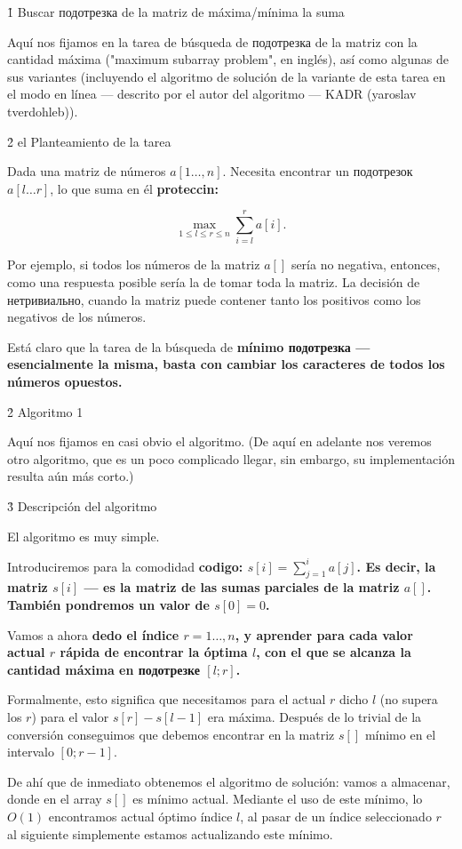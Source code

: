 \h1{ Buscar подотрезка de la matriz de máxima/mínima la suma }

Aquí nos fijamos en la tarea de búsqueda de подотрезка de la matriz con la cantidad máxima ("maximum subarray problem", en inglés), así como algunas de sus variantes (incluyendo el algoritmo de solución de la variante de esta tarea en el modo en línea --- descrito por el autor del algoritmo --- KADR (yaroslav tverdohleb)).


\h2{ el Planteamiento de la tarea }

Dada una matriz de números $a[1 \ldots, n]$. Necesita encontrar un подотрезок $a[l \ldots r]$, lo que suma en él \bf{proteccin}:

$$ \max_{ 1 \le l \le r \le n } \sum_{i=l}^{r} a[i]. $$

Por ejemplo, si todos los números de la matriz $a[]$ sería no negativa, entonces, como una respuesta posible sería la de tomar toda la matriz. La decisión de нетривиально, cuando la matriz puede contener tanto los positivos como los negativos de los números.

Está claro que la tarea de la búsqueda de \bf{mínimo} подотрезка --- esencialmente la misma, basta con cambiar los caracteres de todos los números opuestos.


\h2{ Algoritmo 1 }

Aquí nos fijamos en casi obvio el algoritmo. (De aquí en adelante nos veremos otro algoritmo, que es un poco complicado llegar, sin embargo, su implementación resulta aún más corto.)

\h3{ Descripción del algoritmo }

El algoritmo es muy simple.

Introduciremos para la comodidad \bf{codigo}: $s[i] = \sum_{j=1}^{i} a[j]$. Es decir, la matriz $s[i]$ --- es la matriz de las sumas parciales de la matriz $a[]$. También pondremos un valor de $s[0] = 0$.

Vamos a ahora \bf{dedo} el índice $r = 1 \ldots, n$, y aprender para cada valor actual $r$ rápida de encontrar la óptima $l$, con el que se alcanza la cantidad máxima en подотрезке $[l; r]$.

Formalmente, esto significa que necesitamos para el actual $r$ dicho $l$ (no supera los $r$) para el valor $s[r] - s[l-1]$ era máxima. Después de lo trivial de la conversión conseguimos que debemos encontrar en la matriz $s[]$ mínimo en el intervalo $[0;r-1]$.

De ahí que de inmediato obtenemos el algoritmo de solución: vamos a almacenar, donde en el array $s[]$ es mínimo actual. Mediante el uso de este mínimo, lo $O(1)$ encontramos actual óptimo índice $l$, al pasar de un índice seleccionado $r$ al siguiente simplemente estamos actualizando este mínimo.

